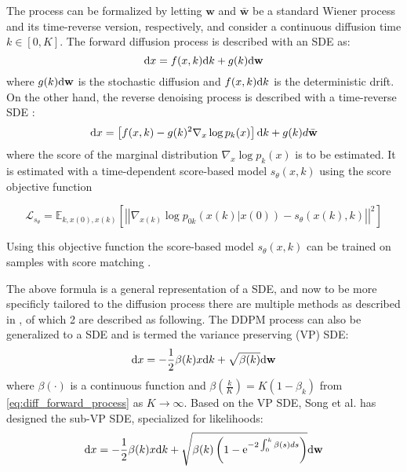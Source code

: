 The process can be formalized by letting $\mathbf{w}$ and $\bar{\mathbf{w}}$ be a standard Wiener process and its time-reverse version, respectively, and consider a continuous diffusion time $k \in [0, K]$. The forward diffusion process is described with an SDE as:
\begin{equation}
    \mathrm{d} x = f(x, k)\mathrm{d} k + g(k)\mathrm{d} \mathbf{w}
\end{equation}
where $g(k)\mathrm{d} \mathbf{w}$ is the stochastic diffusion and $f(x,k)\mathrm{d} k$ is the deterministic drift. 
On the other hand, the reverse denoising process is described with a time-reverse SDE \cite{anderson_reverse-time_1982}:
\begin{equation} \label{eq:sde_reverse_process}
    \mathrm{d} x = \left[ f(x, k) - g(k)^2 \nabla_x \log{p_k(x)} \right] \mathrm{d} k + g(k)d\bar{\mathbf{w}}
\end{equation}
where the score of the marginal distribution $\nabla_x \log{p_k(x)}$ is to be estimated. It is estimated with a time-dependent score-based model $s_\theta(x, k)$ using the score objective function

\begin{equation} \label{eq:sde_train_obj}
    \mathcal{L}_{s_\theta} = \mathbb{E}_{k, x(0), x(k)} \left[\left|\left| \nabla_{x(k)} \log{p_{0k}(x(k) | x(0))} - s_\theta(x(k), k)\right|\right|^2 \right]    
\end{equation}

Using this objective function the score-based model $s_\theta(x, k)$ can be trained on samples with score matching \cite{song_score-based_2021, hyvarinen_estimation_2005, song_sliced_2020, pang_efficient_2020, holzschuh_score_2023}.

The above formula is a general representation of a SDE, and now to be more specificly tailored to the diffusion process there are multiple methods as described in \textcite{song_score-based_2021}, of which 2 are described as following. 
The DDPM process can also be generalized to a SDE and is termed the variance preserving (VP) SDE:
\begin{equation} \label{eq:sde_vp}
    \mathrm{d} x = - \frac{1}{2}\beta(k)x \mathrm{d} k + \sqrt{\beta(k)}\mathrm{d} \mathbf{w}
\end{equation}
where $\beta(\cdot)$ is a continuous function and $\beta(\frac{k}{K}) = K(1 - \beta_k)$ from \eqref{eq:diff_forward_process} as $K \rightarrow \infty$. Based on the VP SDE, Song et al. \cite{song_score-based_2021} has designed the sub-VP SDE, specialized for likelihoods:
\begin{equation} \label{eq:sde_sub-vp}
     \mathrm{d} x = - \frac{1}{2}\beta(k)x \mathrm{d}k + \sqrt{\beta(k) \left(1 - \mathrm{e}^{-2 \int_0^k \beta(s)ds}  \right) }\mathrm{d} \mathbf{w}
\end{equation}

